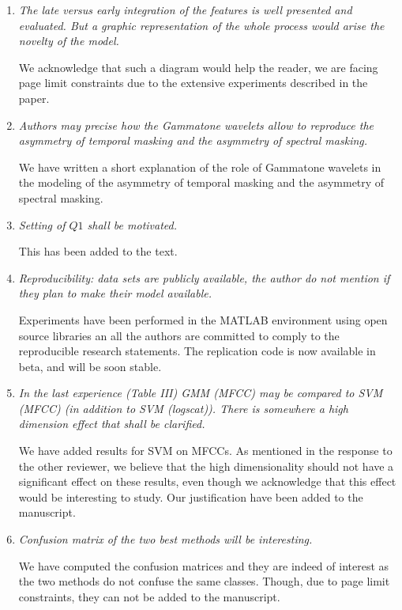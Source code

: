 \documentclass[10pt]{article}
\begin{document}
\begin{enumerate}

\item \emph{The late versus early integration of the features is well presented and evaluated. But a graphic representation of the whole process would arise the novelty of the model.}

We acknowledge that such a diagram would help the reader, we are facing page limit constraints due to the extensive experiments described in the paper.

\item \emph{Authors may precise how the Gammatone wavelets allow to reproduce the asymmetry of temporal masking and the asymmetry of spectral masking.}

We have written a short explanation of the role of Gammatone wavelets in the modeling of the asymmetry of temporal masking and the asymmetry of spectral masking.

\item \emph{Setting of $Q1$ shall be motivated.}

This has been added to the text.

\item \emph{Reproducibility:  data sets are publicly available, the author do not mention if they plan to make their model available.}

Experiments have been performed in the MATLAB environment using open source libraries an all the authors are committed to comply to the reproducible research statements. The replication code is now available in beta, and will be soon stable.

\item \emph{In the last experience (Table III) GMM (MFCC) may be compared to SVM (MFCC) (in addition to SVM (logscat)). There is somewhere a high dimension effect that shall be clarified.}

We have added results for SVM on MFCCs. As mentioned in the response to the other reviewer, we believe that the high dimensionality should not have a significant effect on these results, even though we acknowledge that this effect would be interesting to study. Our justification have been added to the manuscript.

\item \emph{Confusion matrix of the two best methods will be interesting.}

We have computed the confusion matrices and they are indeed of interest as the two methods do not confuse the same classes. Though, due to page limit constraints, they can not be added to the manuscript.


\end{enumerate}
\end{document}
